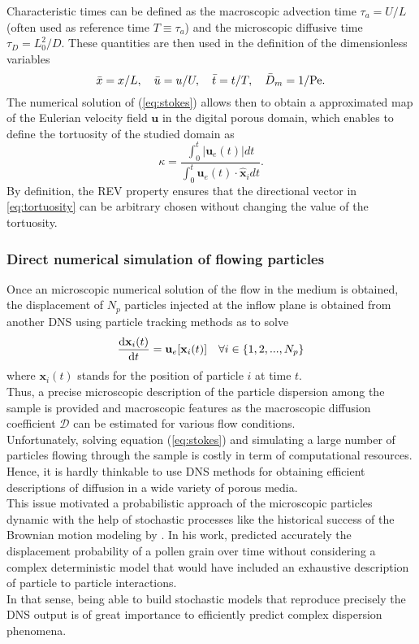 Characteristic times can be defined as the macroscopic advection time $\tau_a=U/L$ (often used as reference time $T\equiv\tau_a$) and the microscopic diffusive time $\tau_D=L_0^2/D$.
These quantities are then used in the definition of the dimensionless variables
\begin{equation}
\bar{x}=x/L,\quad \bar{u}=u/U,\quad \bar{t}=t/T,\quad \bar{D}_m=1/\mathrm{Pe}.
\end{equation}
The numerical solution of (\ref{eq:stokes}) allows then to obtain a approximated map of the Eulerian velocity field $\textbf{u}$ in the digital porous domain, which enables to define the tortuosity of the studied domain as
\begin{equation}\label{eq:tortuosity}
\kappa=\frac{\int_0^t|\textbf{u}_e(t)|dt}{\int_0^t \textbf{u}_e(t)\cdot\hat{\textbf{x}}_idt}.
\end{equation}
By definition, the REV property ensures that the directional vector in \eqref{eq:tortuosity} can be arbitrary chosen without changing the value of the tortuosity.\\

\subsubsection{Direct numerical simulation of flowing particles}
Once an microscopic numerical solution of the flow in the medium is obtained, the displacement of $N_p$ particles injected at the inflow plane is obtained from another DNS using particle tracking methods as \citet{Pollock1988} to solve
\begin{equation}\label{eq:traject}
\dv{\textbf{x}_i(t)}{t}=\textbf{u}_e[\textbf{x}_i(t)]\quad\forall i\in\{1,2,...,N_p\}
\end{equation}
where $\textbf{x}_i(t)$ stands for the position of particle $i$ at time $t$.\\
Thus, a precise microscopic description of the particle dispersion among the sample is provided and macroscopic features as the macroscopic diffusion coefficient $\mathcal{D}$ can be estimated for various flow conditions.\\
Unfortunately, solving equation (\ref{eq:stokes}) and simulating a large number of particles flowing through the sample is costly in term of computational resources. Hence, it is hardly thinkable to use DNS methods for obtaining efficient descriptions of diffusion in a wide variety of porous media.\\
This issue motivated a probabilistic approach of the microscopic particles dynamic with the help of stochastic processes like the historical success of the Brownian motion modeling by \citet{Einstein1906}. 
In his work, \citeauthor{Einstein1906} predicted accurately the displacement probability of a pollen grain over time without considering a complex deterministic model that would have included an exhaustive description of particle to particle interactions.\\
In that sense, being able to build stochastic models that reproduce precisely the DNS output is of great importance to efficiently predict complex dispersion phenomena.

